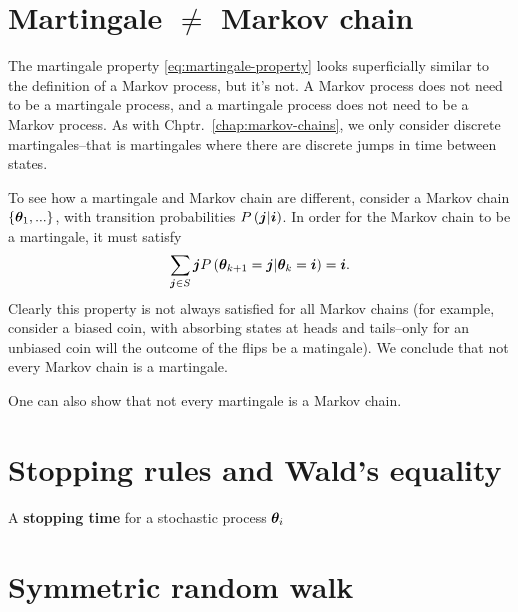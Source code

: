 \section{Martingale $\neq$ Markov chain}

The martingale property \eqref{eq:martingale-property} looks superficially similar to the definition of a Markov process, but it's not.
A Markov process does not need to be a martingale process, and a martingale process does not need to be a Markov process.
As with Chptr.~\ref{chap:markov-chains}, we only consider discrete martingales--that is martingales where there are discrete jumps in time between states.

To see how a martingale and Markov chain are different, consider a Markov chain $\{{\bm \theta}_1,...\}$, with transition probabilities $P\left({\bm j}|{\bm i}\right)$.
In order for the Markov chain to be a martingale, it must satisfy
\begin{align}
    \sum_{{\bm j}\in S}  {\bm j} P\left({\bm \theta}_{k+1}={\bm j}|{\bm \theta}_{k}={\bm i}\right) = {\bm i}
    .
\end{align}
Clearly this property is not always satisfied for all Markov chains (for example, consider a biased coin, with absorbing states at heads and tails--only for an unbiased coin will the outcome of the flips be a matingale).
We conclude that not every Markov chain is a martingale.

One can also show that not every martingale is a Markov chain.

\section{Stopping rules and Wald's equality}

A \textbf{stopping time} for a stochastic process ${\bm \theta}_i$ 

\section{Symmetric random walk\label{sec:symmetric-random-walk}}

